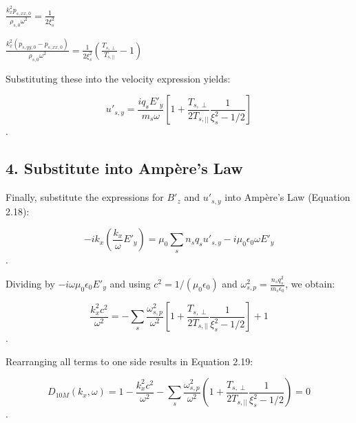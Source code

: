 \documentclass{wsconf}
\begin{document}
$\frac{k_x^2 p_{s,xx,0}}{\rho_{s,0} \omega^2} = \frac{1}{2\xi_s^2}$

$\frac{k_x^2 (p_{s,yy,0} - p_{s,xx,0})}{\rho_{s,0} \omega^2} = \frac{1}{2\xi_s^2} \left( \frac{T_{s,\perp}}{T_{s,||}} - 1 \right)$

Substituting these into the velocity expression yields:

$$u'_{s,y} = \frac{i q_s E'_y}{m_s \omega} \left[ 1 + \frac{T_{s,\perp}}{2T_{s,||}} \frac{1}{\xi_s^2 - 1/2} \right]$$.

\subsection{4. Substitute into Ampère’s Law}
 

Finally, substitute the expressions for $B'_z$ and $u'_{s,y}$ into Ampère’s Law (Equation 2.18):

$$-ik_x \left( \frac{k_x}{\omega} E'_y \right) = \mu_0 \sum_s n_s q_s u'_{s,y} - i\mu_0 \epsilon_0 \omega E'_y$$.

Dividing by $-i \omega \mu_0 \epsilon_0 E'_y$ and using $c^2 = 1/(\mu_0 \epsilon_0)$ and $\omega_{s,p}^2 = \frac{n_s q_s^2}{m_s \epsilon_0}$, we obtain:

$$\frac{k_x^2 c^2}{\omega^2} = -\sum_s \frac{\omega_{s,p}^2}{\omega^2} \left[ 1 + \frac{T_{s,\perp}}{2T_{s,||}} \frac{1}{\xi_s^2 - 1/2} \right] + 1$$.

Rearranging all terms to one side results in Equation 2.19:

$$D_{10M} (k_x, \omega) = 1 - \frac{k^2_x c^2}{\omega^2} - \sum_s \frac{\omega^2_{s,p}}{\omega^2} \left( 1 + \frac{T_{s,\perp}}{2T_{s,||}} \frac{1}{\xi^2_s - 1/2} \right) = 0$$.
\end{document}
